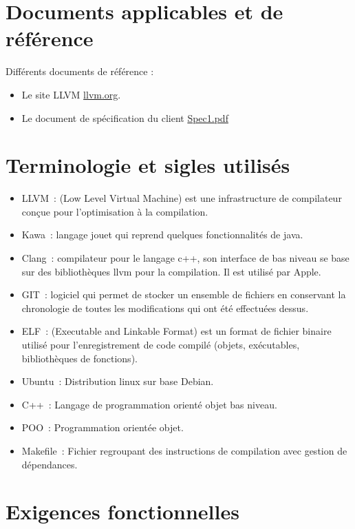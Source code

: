 \documentclass{../res/univ-projet}
\begin{document}
\section{Documents applicables et de référence}
Différents documents de référence :
\begin{itemize}

\item Le site LLVM \href{http://llvm.org}{llvm.org}.
\item Le document de spécification du client \href{file:../client/spec1.pdf}{Spec1.pdf}
\end{itemize}
\newpage
\section{Terminologie et sigles utilisés}
  \begin{itemize}
  	\item LLVM : (Low Level Virtual Machine) est une infrastructure de compilateur conçue pour l'optimisation à la compilation.
	\item Kawa : langage jouet qui reprend quelques fonctionnalités de java.
	\item Clang : compilateur pour le langage c++, son interface de bas niveau  se base sur des bibliothèques llvm pour la compilation. Il est utilisé par Apple.
	\item GIT : logiciel qui permet de stocker un ensemble de fichiers en conservant la chronologie de toutes les modifications qui ont été effectuées dessus.
	\item ELF : (Executable and Linkable Format) est un format de fichier binaire utilisé pour l'enregistrement de code compilé (objets, exécutables, bibliothèques de fonctions).
	\item Ubuntu : Distribution linux sur base Debian.
	\item C++ : Langage de programmation orienté objet bas niveau.
	\item POO : Programmation orientée objet.
	\item Makefile : Fichier regroupant des instructions de compilation avec gestion de dépendances.
  \end{itemize}

\section{Exigences fonctionnelles}
\end{document}
